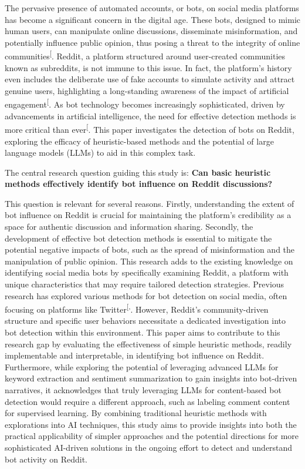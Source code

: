 \documentclass[
  12pt,
  letterpaper,
  DIV=11,
  numbers=noendperiod,
  abstract]{scrartcl}
\begin{document}
The pervasive presence of automated accounts, or bots, on social media
platforms has become a significant concern in the digital age. These
bots, designed to mimic human users, can manipulate online discussions,
disseminate misinformation, and potentially influence public opinion,
thus posing a threat to the integrity of online
communities\textsuperscript{{[}\citeproc{ref-botdetectionreddit}{1}{]}}.
Reddit, a platform structured around user-created communities known as
subreddits, is not immune to this issue. In fact, the platform's history
even includes the deliberate use of fake accounts to simulate activity
and attract genuine users, highlighting a long-standing awareness of the
impact of artificial
engagement\textsuperscript{{[}\citeproc{ref-redditbotproblem}{2}{]}}. As
bot technology becomes increasingly sophisticated, driven by
advancements in artificial intelligence, the need for effective
detection methods is more critical than
ever\textsuperscript{{[}\citeproc{ref-botdetectionreddit}{1}{]}}. This
paper investigates the detection of bots on Reddit, exploring the
efficacy of heuristic-based methods and the potential of large language
models (LLMs) to aid in this complex task.

The central research question guiding this study is: \textbf{Can basic
heuristic methods effectively identify bot influence on Reddit
discussions?}

This question is relevant for several reasons. Firstly, understanding
the extent of bot influence on Reddit is crucial for maintaining the
platform's credibility as a space for authentic discussion and
information sharing. Secondly, the development of effective bot
detection methods is essential to mitigate the potential negative
impacts of bots, such as the spread of misinformation and the
manipulation of public opinion. This research adds to the existing
knowledge on identifying social media bots by specifically examining
Reddit, a platform with unique characteristics that may require tailored
detection strategies. Previous research has explored various methods for
bot detection on social media, often focusing on platforms like
Twitter\textsuperscript{{[},\citeproc{ref-multibotdetector}{4}{]}}.
However, Reddit's community-driven structure and specific user behaviors
necessitate a dedicated investigation into bot detection within this
environment. This paper aims to contribute to this research gap by
evaluating the effectiveness of simple heuristic methods, readily
implementable and interpretable, in identifying bot influence on Reddit.
Furthermore, while exploring the potential of leveraging advanced LLMs
for keyword extraction and sentiment summarization to gain insights into
bot-driven narratives, it acknowledges that truly leveraging LLMs for
content-based bot detection would require a different approach, such as
labeling comment content for supervised learning. By combining
traditional heuristic methods with explorations into AI techniques, this
study aims to provide insights into both the practical applicability of
simpler approaches and the potential directions for more sophisticated
AI-driven solutions in the ongoing effort to detect and understand bot
activity on Reddit.
\end{document}
